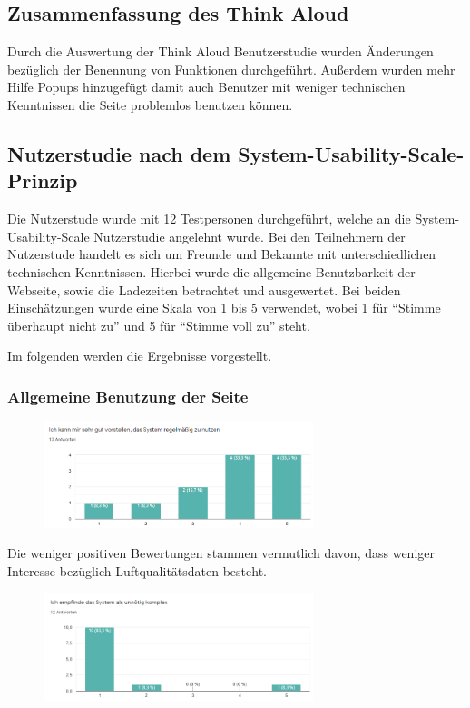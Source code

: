 \subsection{Zusammenfassung des Think Aloud}
Durch die Auswertung der Think Aloud Benutzerstudie wurden Änderungen bezüglich der Benennung von Funktionen durchgeführt. Außerdem wurden mehr Hilfe Popups hinzugefügt damit auch Benutzer mit weniger
technischen Kenntnissen die Seite problemlos benutzen können.

\subsection{Nutzerstudie nach dem System-Usability-Scale-Prinzip}
Die Nutzerstude wurde mit 12 Testpersonen durchgeführt, welche an die System-Usability-Scale Nutzerstudie angelehnt wurde. 
Bei den Teilnehmern der Nutzerstude handelt es sich um Freunde und Bekannte mit unterschiedlichen technischen Kenntnissen. 
Hierbei wurde die allgemeine Benutzbarkeit der Webseite, sowie die Ladezeiten betrachtet und ausgewertet.
Bei beiden Einschätzungen wurde eine Skala von 1 bis 5 verwendet, wobei 1 für \enquote{Stimme überhaupt nicht zu} und 5 für \enquote{Stimme voll zu} steht.

Im folgenden werden die Ergebnisse vorgestellt.
\subsubsection{Allgemeine Benutzung der Seite}
\begin{figure}[H]
    \centering
    \includegraphics[width=0.7\textwidth]{media/survey/regularUsage.png}
\end{figure}
Die weniger positiven Bewertungen stammen vermutlich davon, dass weniger Interesse bezüglich Luftqualitätsdaten besteht.

\begin{figure}[H]
    \centering
    \includegraphics[width=0.7\textwidth]{media/survey/complexity.png}
\end{figure}

